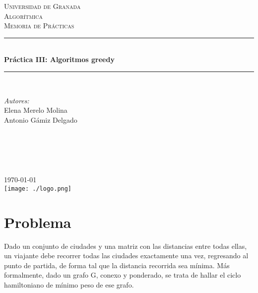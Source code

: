 \documentclass[11pt]{article}
\begin{document}
\begin{titlepage}
\newcommand{\HRule}{\rule{\linewidth}{0.5mm}}
\center
\textsc{\LARGE Universidad de Granada}\\[1.5cm] %
\textsc{\Large Algorítmica}\\[0.5cm] %
\textsc{\large Memoria de Prácticas}\\[0.5cm] %
\HRule \\[0.4cm]
{ \huge \bfseries Práctica III: Algoritmos greedy}\\[0.4cm] %
\HRule \\[1.5cm]
\begin{minipage}{0.4\textwidth}
\begin{flushleft} \large
\emph{Autores:}\\
Elena Merelo Molina \\
Antonio Gámiz Delgado\textsc{} %
\end{flushleft}
\end{minipage}
~
\begin{minipage}{0.4\textwidth}
\begin{flushright} \large
\emph{} \\
\textsc{} %
\end{flushright}
\end{minipage}\\[2cm]
{\large \today}\\[2cm] %
\texttt{[image: ./logo.png]}\\[1cm]
\vfill %
\end{titlepage}

\section{Problema}

Dado un conjunto de ciudades y una matriz con las distancias entre todas ellas, un viajante debe recorrer todas las ciudades exactamente una vez, regresando al punto de partida, de forma tal que la distancia recorrida sea mínima. Más formalmente, dado un grafo G, conexo y ponderado, se trata de hallar el ciclo hamiltoniano de mínimo peso de ese grafo.
\end{document}
